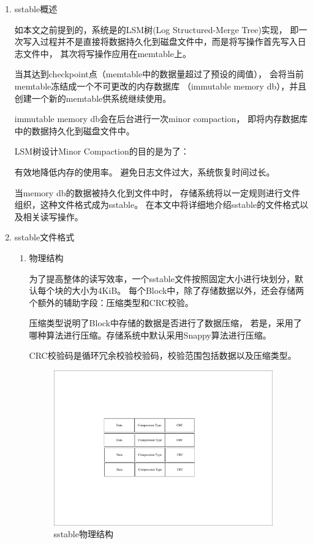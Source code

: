 			\begin{enumerate}
				\item sstable概述
				
				如本文之前提到的，系统是的LSM树(Log Structured-Merge Tree)实现，
				即一次写入过程并不是直接将数据持久化到磁盘文件中，而是将写操作首先写入日志文件中，
				其次将写操作应用在memtable上。

				当其达到checkpoint点（memtable中的数据量超过了预设的阈值），
				会将当前memtable冻结成一个不可更改的内存数据库
				（immutable memory db），并且创建一个新的memtable供系统继续使用。

				immutable memory db会在后台进行一次minor compaction，
				即将内存数据库中的数据持久化到磁盘文件中。

				LSM树设计Minor Compaction的目的是为了：

				有效地降低内存的使用率。
				避免日志文件过大，系统恢复时间过长。
				
				当memory db的数据被持久化到文件中时，
				存储系统将以一定规则进行文件组织，这种文件格式成为sstable。
				在本文中将详细地介绍sstable的文件格式以及相关读写操作。

				\item sstable文件格式
				

				\begin{enumerate}
					\item 物理结构

					为了提高整体的读写效率，一个sstable文件按照固定大小进行块划分，默认每个块的大小为4KiB。
					每个Block中，除了存储数据以外，还会存储两个额外的辅助字段：压缩类型和CRC校验。
	
					压缩类型说明了Block中存储的数据是否进行了数据压缩，
					若是，采用了哪种算法进行压缩。存储系统中默认采用Snappy算法进行压缩。
	
					CRC校验码是循环冗余校验校验码，校验范围包括数据以及压缩类型。
					
					\begin{figure}[H]
						\centering
						\includegraphics[width=0.95\textwidth]{pdf/sstable_physic.pdf}
						\caption{sstable物理结构}
						\label{sstable_physic}
					\end{figure}
					

\end{enumerate}
\end{enumerate}
